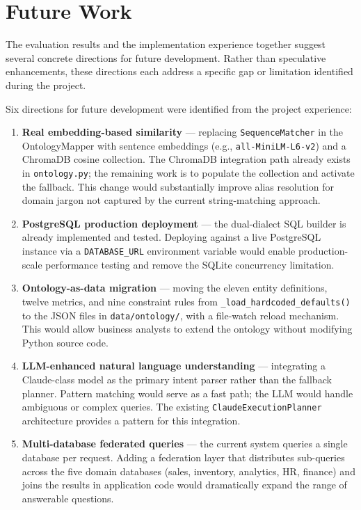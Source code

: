 \documentclass[12pt,a4paper]{report}
\begin{document}
\section{Future Work}
\label{sec:future-work}

The evaluation results and the implementation experience together suggest several concrete directions for future development. Rather than speculative enhancements, these directions each address a specific gap or limitation identified during the project.

Six directions for future development were identified from the project experience:

\begin{enumerate}[leftmargin=2em,label=\arabic*.]
  \item \textbf{Real embedding-based similarity} — replacing \texttt{SequenceMatcher} in the OntologyMapper with sentence embeddings (e.g., \texttt{all-MiniLM-L6-v2}) and a ChromaDB cosine collection. The ChromaDB integration path already exists in \texttt{ontology.py}; the remaining work is to populate the collection and activate the fallback. This change would substantially improve alias resolution for domain jargon not captured by the current string-matching approach.

  \item \textbf{PostgreSQL production deployment} — the dual-dialect \ac{SQL} builder is already implemented and tested. Deploying against a live PostgreSQL instance via a \texttt{DATABASE\_URL} environment variable would enable production-scale performance testing and remove the SQLite concurrency limitation.

  \item \textbf{Ontology-as-data migration} — moving the eleven entity definitions, twelve metrics, and nine constraint rules from \texttt{\_load\_hardcoded\_defaults()} to the JSON files in \texttt{data/ontology/}, with a file-watch reload mechanism. This would allow business analysts to extend the ontology without modifying Python source code.

  \item \textbf{LLM-enhanced natural language understanding} — integrating a Claude-class model as the primary intent parser rather than the fallback planner. Pattern matching would serve as a fast path; the \ac{LLM} would handle ambiguous or complex queries. The existing \texttt{ClaudeExecutionPlanner} architecture provides a pattern for this integration.

  \item \textbf{Multi-database federated queries} — the current system queries a single database per request. Adding a federation layer that distributes sub-queries across the five domain databases (sales, inventory, analytics, HR, finance) and joins the results in application code would dramatically expand the range of answerable questions.


\end{enumerate}
\end{document}

